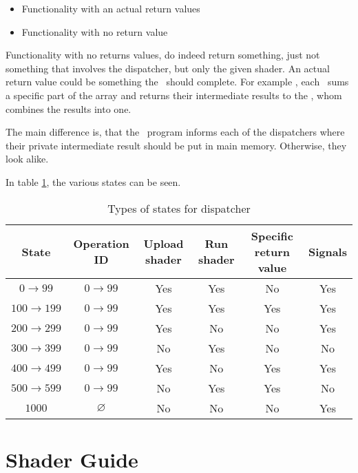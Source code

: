\begin{itemize}
\item{Functionality with an actual return values}
\item{Functionality with no return value}
\end{itemize}

Functionality with no returns values, do indeed return something, just
not something that involves the dispatcher, but only the given
shader. An actual return value could be something the \PPE\ should
complete. For example , each \SPE\ sums a specific part
of the array and returns their intermediate results to the \PPE{},
whom combines the results into one.

The main difference is, that the \PPE\ program informs each of the
dispatchers where their private intermediate result should be put in
main memory. Otherwise, they look alike.

In table \ref{tbl:states}, the various states can be seen. 

\begin{table}
\begin{tabular}{|c|c|c|c|c|c|}
\hline
State         & Operation ID  & Upload shader & Run shader & Specific return value & Signals \\
\hline
$0 \to 99$    & $0 \to 99$    & Yes           & Yes       & No                     & Yes \\
$100 \to 199$ & $0 \to 99$    & Yes           & Yes       & Yes                    & Yes \\
$200 \to 299$ & $0 \to 99$    & Yes           & No        & No                     & Yes \\
$300 \to 399$ & $0 \to 99$    & No            & Yes       & No                     & No  \\
$400 \to 499$ & $0 \to 99$    & Yes           & No        & Yes                    & Yes \\
$500 \to 599$ & $0 \to 99$    & No            & Yes       & Yes                    & No  \\
\hline
$1000$        & $\varnothing$ & No            & No        & No                     & Yes \\
\hline
\end{tabular}
\caption{Types of states for dispatcher\label{tbl:states}}
\end{table}

\section{Shader Guide}

